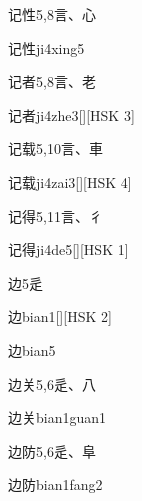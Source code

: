 \begin{entry}{记性}{5,8}{⾔、⼼}
  \begin{phonetics}{记性}{ji4xing5}
  \end{phonetics}
\end{entry}

\begin{entry}{记者}{5,8}{⾔、⽼}
  \begin{phonetics}{记者}{ji4zhe3}[][HSK 3]
  \end{phonetics}
\end{entry}

\begin{entry}{记载}{5,10}{⾔、⾞}
  \begin{phonetics}{记载}{ji4zai3}[][HSK 4]
  \end{phonetics}
\end{entry}

\begin{entry}{记得}{5,11}{⾔、⼻}
  \begin{phonetics}{记得}{ji4de5}[][HSK 1]
  \end{phonetics}
\end{entry}

\begin{entry}{边}{5}{⾡}
  \begin{phonetics}{边}{bian1}[][HSK 2]
  \end{phonetics}
  \begin{phonetics}{边}{bian5}
  \end{phonetics}
\end{entry}

\begin{entry}{边关}{5,6}{⾡、⼋}
  \begin{phonetics}{边关}{bian1guan1}
  \end{phonetics}
\end{entry}

\begin{entry}{边防}{5,6}{⾡、⾩}
  \begin{phonetics}{边防}{bian1fang2}
  \end{phonetics}
\end{entry}

